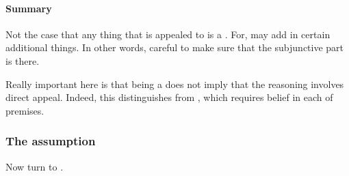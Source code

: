 \paragraph{Summary}

\begin{note}
  Not the case that any thing that is appealed to is a \requ{}.
  For, may add in certain additional things.
  In other words, careful to make sure that the subjunctive part is there.
\end{note}

\begin{note}
  Really important here is that being a \requ{} does not imply that the reasoning involves direct appeal.
  {
    \color{red}
    Indeed, this distinguishes from \citeauthor{Sgaravatti:2013wu}, which requires belief in each of premises.
  }
\end{note}

\subsubsection{The assumption}
\label{sec:two-assumpt-relat-to-requ}

\begin{note}
  Now turn to \ideaCSB{}.
\end{note}

